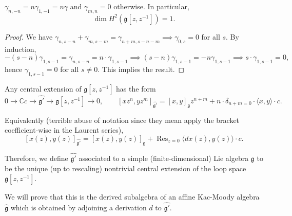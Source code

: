\documentclass[12pt]{article}
\begin{document}
\begin{corollary}
    $\gamma_{n,-n} = n\gamma_{1,-1} = n\gamma$ and $\gamma_{m,n} = 0$ otherwise. In particular,
    \[
        \dim H^2(\mathfrak{g}[z,z^{-1}]) = 1.
    \]
\end{corollary}

\begin{proof}
    We have $\gamma_{n,s-n} + \gamma_{m,s-m} = \gamma_{n+m,s-n-m} \implies \gamma_{0,s} = 0$ for all $s$. By induction,
    \[
        -(s-n)\gamma_{1,s-1} = \gamma_{n,s-n} = n \cdot \gamma_{1,s-1} \implies (s-n)\gamma_{1,s-1} = -n\gamma_{1,s-1}
        \implies s \cdot \gamma_{1,s-1} = 0,
    \]
    hence $\gamma_{1,s-1} = 0$ for all $s \neq 0$. This implies the result.
\end{proof}

\begin{definition}
    Any central extension of $\mathfrak{g}[z,z^{-1}]$ has the form
    \[
        0 \to \mathbb{C}c \to \widehat{\mathfrak{g}'} \to \mathfrak{g}[z,z^{-1}] \to 0,
        \qquad
    [xz^n, yz^m]_{\widehat{\mathfrak{g}'}} = [x,y]_{\mathfrak{g}} z^{n+m} + n \cdot \delta_{n+m=0} \cdot \langle x,y \rangle \cdot c.
    \]

    Equivalently (terrible abuse of notation since they mean apply the bracket coefficient-wise in the Laurent series),
    \[
        [x(z), y(z)]_{\widehat{\mathfrak{g}'}} = [x(z), y(z)]_{\mathfrak{g}} + \operatorname{Res}_{z=0}\langle dx(z), y(z) \rangle \cdot c.
    \]

    Therefore, we define $\widehat{\mathfrak{g}'}$ associated to a simple (finite-dimensional) Lie algebra $\mathfrak{g}$ to be the unique (up to rescaling) nontrivial central extension of the loop space $\mathfrak{g}[z,z^{-1}]$.
\end{definition}

\begin{remark}
    We will prove that this is the derived subalgebra of an affine Kac-Moody algebra $\widehat{\mathfrak{g}}$ which is obtained by adjoining a derivation $d$ to $\widehat{\mathfrak{g}'}$.
\end{remark}
\end{document}
